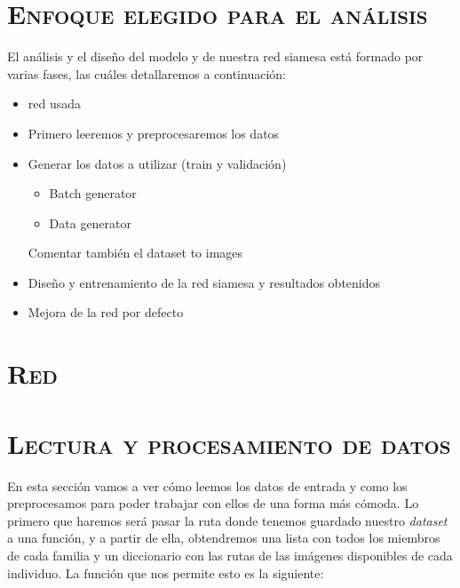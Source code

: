 \documentclass[11pt,a4paper]{article}
\begin{document}
\section{\textsc{Enfoque elegido para el análisis}}

El análisis y el diseño del modelo y de nuestra red siamesa está formado por varias fases, las cuáles
detallaremos a continuación:

\begin{itemize}
    \item red usada
    \item Primero leeremos y preprocesaremos los datos
    \item Generar los datos a utilizar (train y validación)
        
        \begin{itemize}
            \item Batch generator
            \item Data generator
        \end{itemize}
        
        Comentar también el dataset to images
    \item Diseño y entrenamiento de la red siamesa y resultados obtenidos
    \item Mejora de la red por defecto
\end{itemize}

\section{\textsc{Red}}

\section{\textsc{Lectura y procesamiento de datos}}

En esta sección vamos a ver cómo leemos los datos de entrada y como los preprocesamos para poder trabajar con
ellos de una forma más cómoda. Lo primero que haremos será pasar la ruta donde tenemos guardado nuestro
\textit{dataset} a una función, y a partir de ella, obtendremos una lista con todos los miembros de cada familia
y un diccionario con las rutas de las imágenes disponibles de cada individuo. La función que nos permite esto
es la siguiente:
\end{document}
